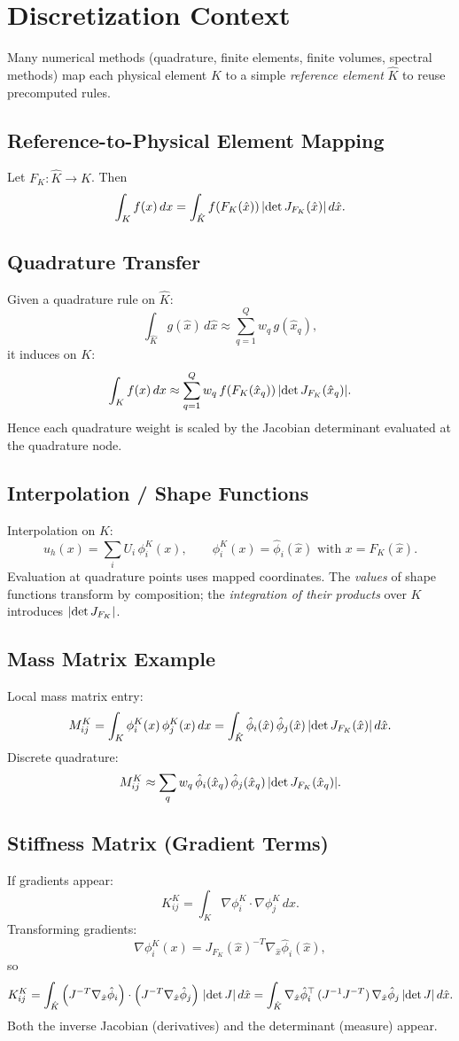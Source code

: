 \documentclass[11pt]{article}
\begin{document}
\section{Discretization Context}
Many numerical methods (quadrature, finite elements, finite volumes, spectral methods) map each physical element \(K\) to a simple \emph{reference element} \(\hat K\) to reuse precomputed rules.

\subsection{Reference-to-Physical Element Mapping}
Let \( F_K: \hat K \to K \). Then
\[
\int_{K} f(x)\, dx = \int_{\hat K} f(F_K(\hat x))\, \abs{\det J_{F_K}(\hat x)}\, d\hat x.
\]

\subsection{Quadrature Transfer}
Given a quadrature rule on \(\hat K\):
\[
\int_{\hat K} g(\hat x)\, d\hat x \approx \sum_{q=1}^Q w_q\, g(\hat x_q),
\]
it induces on \(K\):
\[
\int_{K} f(x)\, dx \approx \sum_{q=1}^Q w_q\, f(F_K(\hat x_q))\, \abs{\det J_{F_K}(\hat x_q)}.
\]
Hence each quadrature weight is scaled by the Jacobian determinant evaluated at the quadrature node.

\subsection{Interpolation / Shape Functions}
Interpolation on \(K\):
\[
u_h(x) = \sum_i U_i\, \phi_i^K(x), \qquad \phi_i^K(x) = \hat \phi_i(\hat x) \text{ with } x=F_K(\hat x).
\]
Evaluation at quadrature points uses mapped coordinates. The \emph{values} of shape functions transform by composition; the \emph{integration of their products} over \(K\) introduces \(\abs{\det J_{F_K}}\).

\subsection{Mass Matrix Example}
Local mass matrix entry:
\[
M_{ij}^K = \int_K \phi_i^K(x)\, \phi_j^K(x)\, dx
= \int_{\hat K} \hat \phi_i(\hat x)\, \hat \phi_j(\hat x)\, \abs{\det J_{F_K}(\hat x)}\, d\hat x.
\]
Discrete quadrature:
\[
M_{ij}^K \approx \sum_q w_q\, \hat \phi_i(\hat x_q)\, \hat \phi_j(\hat x_q)\, \abs{\det J_{F_K}(\hat x_q)}.
\]

\subsection{Stiffness Matrix (Gradient Terms)}
If gradients appear:
\[
K_{ij}^K = \int_K \nabla \phi_i^K \cdot \nabla \phi_j^K\, dx.
\]
Transforming gradients:
\[
\nabla \phi_i^K(x) = J_{F_K}{(\hat x)}^{-T} \nabla_{\hat x} \hat \phi_i(\hat x),
\]
so
\[
K_{ij}^K
= \int_{\hat K} \left(J^{-T}\nabla_{\hat x}\hat \phi_i\right)\cdot
\left(J^{-T}\nabla_{\hat x}\hat \phi_j\right)\, \abs{\det J}\, d\hat x
= \int_{\hat K} \nabla_{\hat x}\hat \phi_i^{\top}\, (J^{-1}J^{-T})\, \nabla_{\hat x}\hat \phi_j\, \abs{\det J}\, d\hat x.
\]
Both the inverse Jacobian (derivatives) and the determinant (measure) appear.
\end{document}
